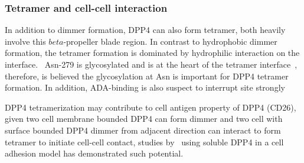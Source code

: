 \subsubsection{Tetramer and cell-cell interaction}

In addition to dimmer formation, DPP4 can also form tetramer, both heavily involve this $beta$-propeller blade region. In contrast to hydrophobic dimmer formation, the tetramer formation is dominated by hydrophilic interaction on the interface.~\cite{Engel_2003} Asn-279 is glycosylated and is at the heart of the tetramer interface~\cite{Engel_2003}, therefore, is believed the glycosylation at Asn is important for DPP4 tetramer formation. In addition, ADA-binding is also suspect to interrupt  site strongly  
\par 
DPP4 tetramerization may contribute to cell antigen property of DPP4 (CD26), given two cell membrane bounded DPP4 can form dimmer and two cell with surface bounded DPP4 dimmer from adjacent direction can interact to form tetramer to initiate cell-cell contact, studies by~\citet{Cheng1998,Abdel-Ghany1998} using soluble DPP4 in a cell adhesion model has demonstrated such potential. 